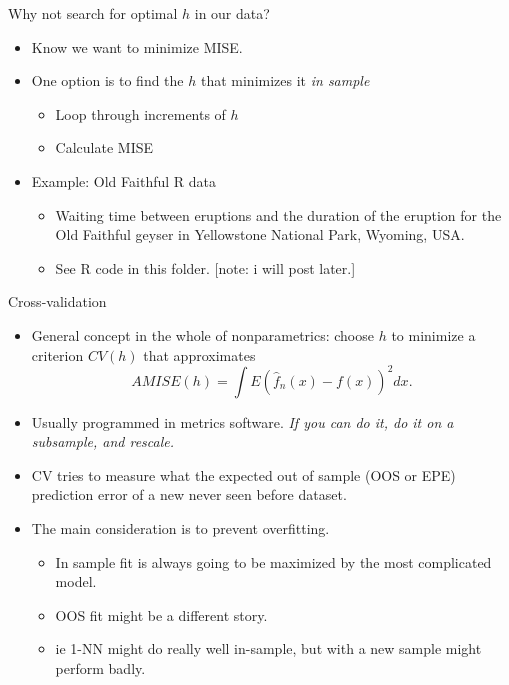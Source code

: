 \documentclass[11pt, aspectratio=169]{beamer}
\begin{document}
\begin{frame}{Why not search for optimal $h$ in our data?}
  \begin{itemize}
  \item Know we want to minimize MISE. 
  \item One option is to find the $h$ that minimizes it \textit{in sample}
  \begin{itemize}
    \item Loop through increments of $h$
    \item Calculate MISE
  \end{itemize}
  \item Example: Old Faithful R data
  \begin{itemize}
    \item Waiting time between eruptions and the duration of the eruption for the Old Faithful geyser in Yellowstone National Park, Wyoming, USA.
    \item See R code in this folder. [note: i will post later.]
  \end{itemize}
  \end{itemize}
\end{frame}

\begin{frame}{Cross-validation}
  \begin{itemize}
  \item General concept in the whole of nonparametrics: choose $h$ to minimize a criterion $CV(h)$ that approximates
  $$ AMISE(h)=\int E(\hat{f}_n(x)-f(x))^2dx.$$
  \item Usually programmed in metrics software. \emph{If you can do it, do it on a subsample, and rescale.}
  \item CV tries to measure what the expected out of sample (OOS or EPE) prediction error of a new never seen before dataset.
  \item The main consideration is to prevent \alert{overfitting}.
  \begin{itemize}
  \item In sample fit is always going to be maximized by the most complicated model.
  \item OOS fit might be a different story.
  \item ie 1-NN might do really well in-sample, but with a new sample might perform badly.
  \end{itemize}
  \end{itemize}
\end{frame}
  
\end{document}
